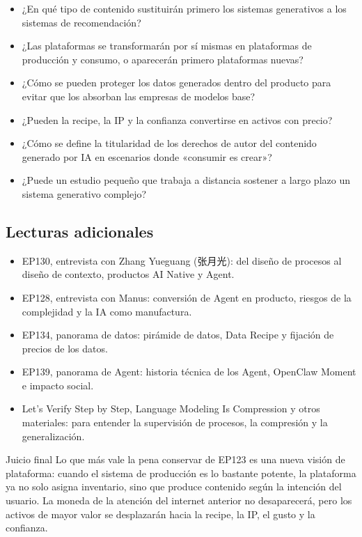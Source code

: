 \documentclass[a4paper]{article}
\begin{document}
\begin{itemize}
\item ¿En qué tipo de contenido sustituirán primero los sistemas generativos a los sistemas de recomendación?
\item ¿Las plataformas se transformarán por sí mismas en plataformas de producción y consumo, o aparecerán primero plataformas nuevas?
\item ¿Cómo se pueden proteger los datos generados dentro del producto para evitar que los absorban las empresas de modelos base?
\item ¿Pueden la recipe, la IP y la confianza convertirse en activos con precio?
\item ¿Cómo se define la titularidad de los derechos de autor del contenido generado por IA en escenarios donde «consumir es crear»?
\item ¿Puede un estudio pequeño que trabaja a distancia sostener a largo plazo un sistema generativo complejo?
\end{itemize}

\subsection{Lecturas adicionales}

\begin{itemize}
\item EP130, entrevista con Zhang Yueguang (张月光): del diseño de procesos al diseño de contexto, productos AI Native y Agent.
\item EP128, entrevista con Manus: conversión de Agent en producto, riesgos de la complejidad y la IA como manufactura.
\item EP134, panorama de datos: pirámide de datos, Data Recipe y fijación de precios de los datos.
\item EP139, panorama de Agent: historia técnica de los Agent, OpenClaw Moment e impacto social.
\item Let's Verify Step by Step, Language Modeling Is Compression y otros materiales: para entender la supervisión de procesos, la compresión y la generalización.
\end{itemize}

\begin{importantbox}{Juicio final}
Lo que más vale la pena conservar de EP123 es una nueva visión de plataforma: cuando el sistema de producción es lo bastante potente, la plataforma ya no solo asigna inventario, sino que produce contenido según la intención del usuario. La moneda de la atención del internet anterior no desaparecerá, pero los activos de mayor valor se desplazarán hacia la recipe, la IP, el gusto y la confianza.
\end{importantbox}
\end{document}
